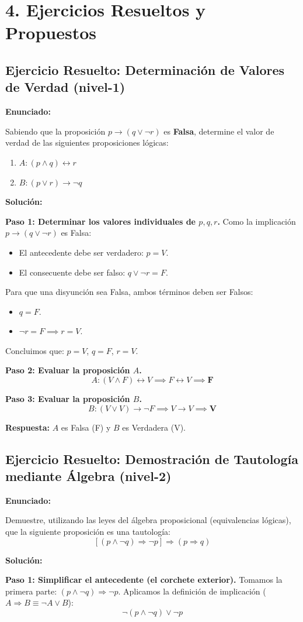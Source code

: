 \documentclass[11pt]{article}
\newenvironment{ejercicios}{\section*{4. Ejercicios Resueltos y Propuestos}}{}
\newenvironment{ejercicioresuelto}[2]{\subsection*{Ejercicio Resuelto: #1 \hfill \normalfont\small(#2)}}{}
\newcommand{\enunciado}[1]{\textbf{Enunciado:}\par#1\par\medskip}
\newcommand{\solucion}[1]{\textbf{Solución:}\par#1\par\bigskip}
\begin{document}
\begin{ejercicios}

  \begin{ejercicioresuelto}{Determinación de Valores de Verdad}{nivel-1}
    \enunciado{
      Sabiendo que la proposición $p \rightarrow (q \vee \neg r)$ es \textbf{Falsa}, determine el valor de verdad de las siguientes proposiciones lógicas:
      \begin{enumerate}
        \item $A: (p \wedge q) \leftrightarrow r$
        \item $B: (p \vee r) \rightarrow \neg q$
      \end{enumerate}
    }
    \solucion{
      \textbf{Paso 1: Determinar los valores individuales de $p, q, r$.}
      Como la implicación $p \rightarrow (q \vee \neg r)$ es Falsa:
      \begin{itemize}
        \item El antecedente debe ser verdadero: $p = V$.
        \item El consecuente debe ser falso: $q \vee \neg r = F$.
      \end{itemize}
      Para que una disyunción sea Falsa, ambos términos deben ser Falsos:
      \begin{itemize}
        \item $q = F$.
        \item $\neg r = F \implies r = V$.
      \end{itemize}
      Concluimos que: $p = V$, $q = F$, $r = V$.

      \textbf{Paso 2: Evaluar la proposición $A$.}
      $$ A: (V \wedge F) \leftrightarrow V \implies F \leftrightarrow V \implies \mathbf{F} $$

      \textbf{Paso 3: Evaluar la proposición $B$.}
      $$ B: (V \vee V) \rightarrow \neg F \implies V \rightarrow V \implies \mathbf{V} $$
      
      \textbf{Respuesta:} $A$ es Falsa (F) y $B$ es Verdadera (V).
    }
  \end{ejercicioresuelto}

  \begin{ejercicioresuelto}{Demostración de Tautología mediante Álgebra}{nivel-2}
    \enunciado{
      Demuestre, utilizando las leyes del álgebra proposicional (equivalencias lógicas), que la siguiente proposición es una tautología:
      $$ [(p \wedge \neg q) \Rightarrow \neg p] \Rightarrow (p \Rightarrow q) $$
    }
    \solucion{
      \textbf{Paso 1: Simplificar el antecedente (el corchete exterior).}
      Tomamos la primera parte: $(p \wedge \neg q) \Rightarrow \neg p$.
      Aplicamos la definición de implicación ($A \Rightarrow B \equiv \neg A \vee B$):
      $$ \neg(p \wedge \neg q) \vee \neg p $$
      
}
\end{ejercicioresuelto}
\end{ejercicios}
\end{document}
